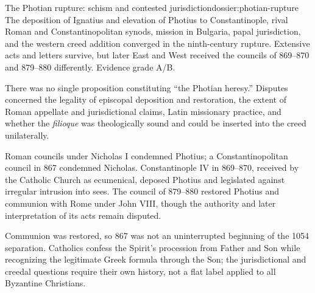 \begin{heresydossier}{The Photian rupture: schism and contested jurisdiction}{dossier:photian-rupture}
\objectfield The deposition of Ignatius and elevation of Photius to Constantinople, rival Roman and Constantinopolitan synods, mission in Bulgaria, papal jurisdiction, and the western creed addition converged in the ninth-century rupture. Extensive acts and letters survive, but later East and West received the councils of 869--870 and 879--880 differently. Evidence grade A/B.

\propositionfield There was no single proposition constituting ``the Photian heresy.'' Disputes concerned the legality of episcopal deposition and restoration, the extent of Roman appellate and jurisdictional claims, Latin missionary practice, and whether the \emph{filioque} was theologically sound and could be inserted into the creed unilaterally.

\responsefield Roman councils under Nicholas I condemned Photius; a Constantinopolitan council in 867 condemned Nicholas. Constantinople IV in 869--870, received by the Catholic Church as ecumenical, deposed Photius and legislated against irregular intrusion into sees. The council of 879--880 restored Photius and communion with Rome under John VIII, though the authority and later interpretation of its acts remain disputed.

\aftermathfield Communion was restored, so 867 was not an uninterrupted beginning of the 1054 separation. Catholics confess the Spirit's procession from Father and Son while recognizing the legitimate Greek formula through the Son; the jurisdictional and creedal questions require their own history, not a flat label applied to all Byzantine Christians.
\end{heresydossier}

